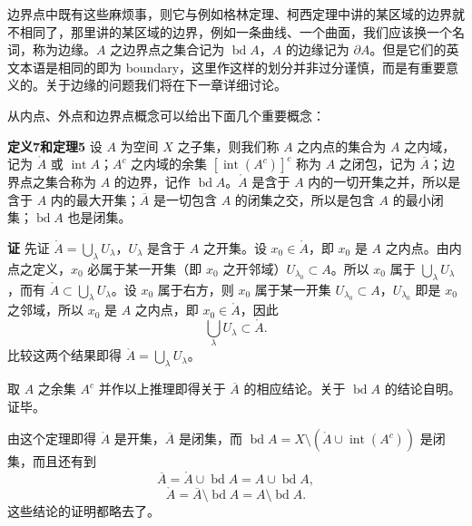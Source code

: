 边界点中既有这些麻烦事，则它与例如格林定理、柯西定理中讲的某区域的边界就不相同了，那里讲的某区域的边界，例如一条曲线、一个曲面，我们应该换一个名词，称为边缘。$A$ 之边界点之集合记为 $\operatorname{bd}A$，$A$ 的边缘记为 $\partial A$。但是它们的英文本语是相同的即为 boundary，这里作这样的划分并非过分谨慎，而是有重要意义的。关于边缘的问题我们将在下一章详细讨论。

从内点、外点和边界点概念可以给出下面几个重要概念：

\noindent\textbf{定义7和定理5}\quad
设 $A$ 为空间 $X$ 之子集，则我们称 $A$ 之内点的集合为 $A$ 之内域，记为 $\mathring A$ 或 $\operatorname{int}A$；$A^c$ 之内域的余集 $[\operatorname{int}(A^c)]^c$ 称为 $A$ 之闭包，记为 $\overline A$；边界点之集合称为 $A$ 的边界，记作 $\operatorname{bd}A$。$\mathring A$ 是含于 $A$ 内的一切开集之并，所以是含于 $A$ 内的最大开集；$\overline A$ 是一切包含 $A$ 的闭集之交，所以是包含 $A$ 的最小闭集；$\operatorname{bd}A$ 也是闭集。

\noindent\textbf{证}\quad
先证 $\mathring A=\bigcup_\lambda U_\lambda$，$U_\lambda$ 是含于 $A$ 之开集。设 $x_0\in\mathring A$，即 $x_0$ 是 $A$ 之内点。由内点之定义，$x_0$ 必属于某一开集（即 $x_0$ 之开邻域）$U_{\lambda_0}\subset A$。所以 $x_0$ 属于 $\bigcup_\lambda U_\lambda$，而有 $\mathring A\subset\bigcup_\lambda U_\lambda$。设 $x_0$ 属于右方，则 $x_0$ 属于某一开集 $U_{\lambda_0}\subset A$，$U_{\lambda_0}$ 即是 $x_0$ 之邻域，所以 $x_0$ 是 $A$ 之内点，即 $x_0\in\mathring A$，因此
\[
 \bigcup_\lambda U_\lambda\subset\mathring A.
\]
比较这两个结果即得 $\mathring A=\bigcup_\lambda U_\lambda$。

取 $A$ 之余集 $A^c$ 并作以上推理即得关于 $\overline A$ 的相应结论。关于 $\operatorname{bd}A$ 的结论自明。证毕。

由这个定理即得 $\mathring A$ 是开集，$\overline A$ 是闭集，而 $\operatorname{bd}A=X\setminus(\mathring A\cup\operatorname{int}(A^c))$ 是闭集，而且还有到
\[
 \overline A=\mathring A\cup\operatorname{bd}A=A\cup\operatorname{bd}A,
\]
\[
 \mathring A=\overline A\setminus\operatorname{bd}A=A\setminus\operatorname{bd}A.
\]
这些结论的证明都略去了。

